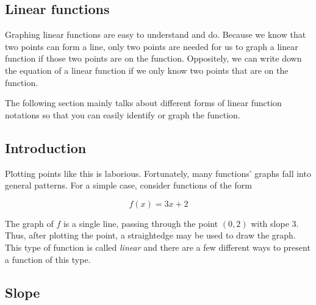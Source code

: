 \subsection{Linear functions}
\label{sss:line-f121}




Graphing linear functions are easy to understand and do. Because we know that two points
can form a line, only two points are needed for us to graph a linear function if those two
points are on the function. Oppositely, we can write down the equation of a linear
function if we only know two points that are on the function.



The following section mainly talks about different forms of linear function notations so
that you can easily identify or graph the function.




\subsection{Introduction}
\label{sss:intr-8800}




Plotting points like this is laborious. Fortunately, many functions' graphs fall into
general patterns. For a simple case, consider functions of the form



$$f(x)=3x+2$$



The graph of $f$ is a single line, passing through the point $(0,2)$ with slope 3. Thus,
after plotting the point, a straightedge may be used to draw the graph. This type of
function is called \textit{linear} and there are a few different ways to present a
function of this type.




\subsection{Slope}
\label{sss:slop-0bbe}




